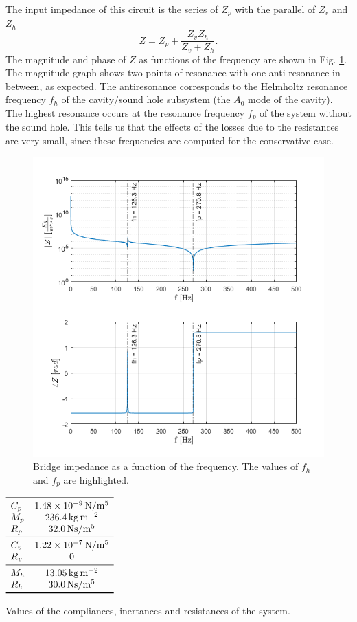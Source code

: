 \documentclass[a4paper]{article}
\begin{document}
The input impedance of this circuit is the series of $Z_p$ with the parallel of $Z_v$ and $Z_h$
$$ Z = Z_p + \frac{Z_v Z_h}{Z_v + Z_h} .$$
The magnitude and phase of $Z$ as functions of the frequency are shown in Fig. \ref{fig:brimp}. The magnitude graph shows two points of resonance with one anti-resonance in between, as expected. The antiresonance corresponds to the Helmholtz resonance frequency $f_h$ of the cavity/sound hole subsystem (the $A_0$ mode of the cavity). The highest resonance occurs at the resonance frequency $f_p$ of the system without the sound hole. This tells us that the effects of the losses due to the resistances are very small, since these frequencies are computed for the conservative case.

\begin{figure}[h]
	\centering
	\includegraphics[width=0.75\linewidth]{bridge_impedance.png}
	\caption{Bridge impedance as a function of the frequency. The values of $f_h$ and $f_p$ are highlighted.}
	\label{fig:brimp}
\end{figure}


 \begin{table}[h]
 	\centering
 	$\begin{array}{lc}
 		\toprule
 		C_p & \SI{1.48e-9}{\newton\per\meter^5}\\
 		M_p & \SI{236.4}{\kilogram\per\meter\squared}\\
 		R_p & \SI{32.0}{\newton\second\per\meter^5}\\
 		\midrule
 		C_v & \SI{1.22e-7}{\newton\per\meter^5}\\
 		R_v & 0\\
 		\midrule
 		M_h & \SI{13.05}{\kilogram\per\meter\squared}\\
 		R_h & \SI{30.0}{\newton\second\per\meter^5}\\
 		\bottomrule
 	\end{array}$
	 \caption{Values of the compliances, inertances and resistances of the system.}
	\label{tab:vals}
 \end{table}
\end{document}
